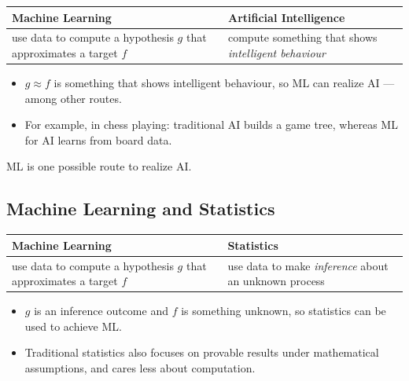 \begin{center}
    \begin{tabular}{@{}p{}p{}@{}}
        \toprule
        \textbf{Machine Learning} & \textbf{Artificial Intelligence}\\
        \midrule
        use data to compute a hypothesis \(g\) that approximates a target \(f\)
        & compute something that shows \emph{intelligent behaviour}\\
        \bottomrule
    \end{tabular}
\end{center}

\begin{itemize}
    \item \(g \approx f\) is something that shows intelligent behaviour, so ML
        can realize AI --- among other routes.
    \item For example, in chess playing: traditional AI builds a game tree,
        whereas ML for AI learns from board data.
\end{itemize}

\begin{moral}
    ML is one possible route to realize AI.
\end{moral}

\subsection{Machine Learning and Statistics}

\begin{center}
    \begin{tabular}{@{}p{}p{}@{}}
        \toprule
        \textbf{Machine Learning} & \textbf{Statistics}\\
        \midrule
        use data to compute a hypothesis \(g\) that approximates a target \(f\)
        & use data to make \emph{inference} about an unknown process\\
        \bottomrule
    \end{tabular}
\end{center}

\begin{itemize}
    \item \(g\) is an inference outcome and \(f\) is something unknown, so
        statistics can be used to achieve ML.
    \item Traditional statistics also focuses on provable results under
        mathematical assumptions, and cares less about computation.
\end{itemize}

